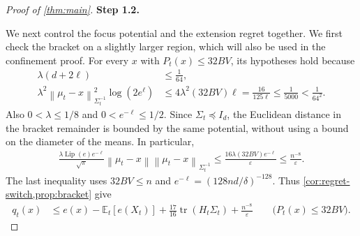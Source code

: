 \documentclass[11pt]{article}
\newcommand{\proofstepinline}[1]{%
    {\sffamily\bfseries\color{blue!55!black}Step #1.}\enspace
}
\newcommand{\E}{\mathbb E}
\newcommand{\tr}{\operatorname{tr}}
\newcommand{\Lip}{\operatorname{Lip}}
\newcommand{\1}{\mathbf 1}
\newcommand{\eps}{\varepsilon}
\newcommand{\norm}[1]{\left\lVert #1\right\rVert}
\newcommand{\normm}[2]{\left\lVert #1\right\rVert_{#2}}
\begin{document}
\begin{proof}[Proof of \cref{thm:main}]
    \proofstepinline{1.2}
    We next control the focus potential and the extension regret together.
    We first check the bracket on a slightly larger region, which will
    also be used in the confinement proof. For every $x$ with
    $P_t(x)\leq32BV$, its hypotheses hold because
    \begin{align}
        \lambda(d+2\ell) & \leq\frac1{64},
        \label{eq:main-stability-bracket-scale}
        \\
        \lambda^2\normm{\mu_t-x}{\Sigma_t^{-1}}^2
        \log(2e^\ell)
                         & \leq4\lambda^2(32BV)\ell
        =\frac{16}{125\ell}
        \leq\frac1{5000}<\frac1{64^2}.
        \label{eq:main-stability-bracket-focus}
    \end{align}
    Also $0<\lambda\leq1/8$ and $0<e^{-\ell}\leq1/2$.
    Since $\Sigma_t\preceq I_d$, the Euclidean distance in the bracket
    remainder is bounded by the same potential, without using a bound
    on the diameter of the means. In particular,
    \begin{align}
        \frac{\lambda\Lip(e)e^{-\ell}}{\sqrt\pi}
        \norm{\mu_t-x}\normm{\mu_t-x}{\Sigma_t^{-1}}
        \leq\frac{16\lambda(32BV)e^{-\ell}}{\eps}
        \leq\frac{n^{-8}}{\eps}.
        \label{eq:main-bracket-tail}
    \end{align}
    The last inequality uses $32BV\leq n$ and
    $e^{-\ell}=(128nd/\delta)^{-128}$.
    Thus \cref{cor:regret-switch,prop:bracket} give
    \begin{align}
        q_t(x)
         & \leq e(x)-\E_t[e(X_t)]
        +\frac{17}{16}\tr(H_t\Sigma_t)+\frac{n^{-8}}{\eps}
        \qquad\bigl(P_t(x)\leq32BV\bigr).
        \label{eq:main-q-upper}
    \end{align}


\end{proof}
\end{document}
